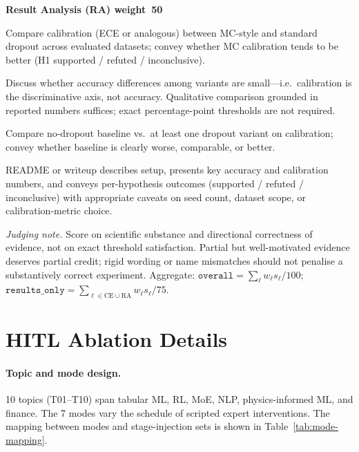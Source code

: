 \documentclass{llmxive}
\begin{document}
\begin{tcolorbox}
\smallskip
\textbf{Result Analysis (RA) \textemdash{} weight~50}
\begin{description}[nosep,leftmargin=1.2em,labelsep=0.4em,font=\ttfamily\small]
\item[t01-result-h1 \normalfont{[20.0]}]
Compare calibration (ECE or analogous) between MC-style and standard dropout
across evaluated datasets; convey whether MC calibration tends to be better
(H1 supported / refuted / inconclusive).
\item[t01-result-h2 \normalfont{[10.0]}]
Discuss whether accuracy differences among variants are small---i.e.\ calibration
is the discriminative axis, not accuracy. Qualitative comparison grounded in
reported numbers suffices; exact percentage-point thresholds are not required.
\item[t01-result-h3 \normalfont{[10.0]}]
Compare no-dropout baseline vs.\ at least one dropout variant on calibration;
convey whether baseline is clearly worse, comparable, or better.
\item[t01-result-writeup \normalfont{[10.0]}]
README or writeup describes setup, presents key accuracy and calibration numbers,
and conveys per-hypothesis outcomes (supported / refuted / inconclusive) with
appropriate caveats on seed count, dataset scope, or calibration-metric choice.
\end{description}

\smallskip
\textit{Judging note.} Score on scientific substance and directional correctness
of evidence, not on exact threshold satisfaction. Partial but well-motivated
evidence deserves partial credit; rigid wording or name mismatches should not
penalise a substantively correct experiment. Aggregate:
$\texttt{overall} = \textstyle\sum_\ell w_\ell s_\ell / 100$;
$\texttt{results\_only} = \textstyle\sum_{\ell \in \mathrm{CE}\cup\mathrm{RA}}
w_\ell s_\ell / 75$.
\end{tcolorbox}

\section{HITL Ablation Details}
\label{app:hitl-setup}

\paragraph{Topic and mode design.} 10 topics (T01--T10) span tabular ML, RL, MoE, NLP, physics-informed ML, and finance. The 7 modes vary the schedule of scripted expert interventions. The mapping between modes and stage-injection sets is shown in Table~\ref{tab:mode-mapping}.
\end{document}
